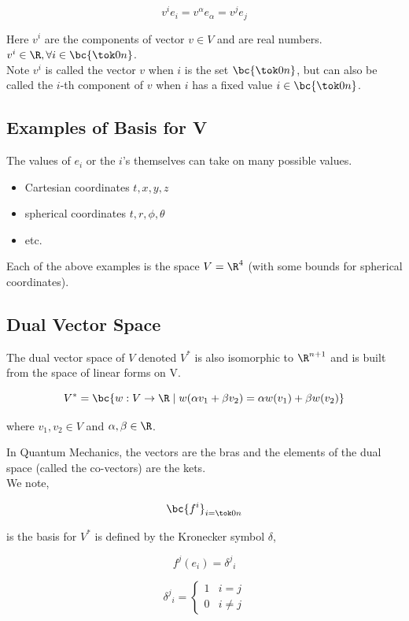 \documentclass{article}
\newcommand{\piecewise}[4]{
    \begin{cases}
        #1 & #2 \\
        #3 & #4
    \end{cases}
}
\begin{document}
\[ v^ie_i = v^{\alpha}e_{\alpha} = v^je_j \]

Here $v^i$ are the components of vector $v \in V$ and are real numbers. $v^i \in \R, \forall i \in \bc{\tok0n}$. \\

Note $v^i$ is called the vector $v$ when $i$ is the set $\bc{\tok0n}$, but can also be called the $i$-th component of $v$ when $i$ has a fixed value $i \in \bc{\tok0n}$. \\

\subsection{Examples of Basis for V}

The values of $e_i$ or the $i$'s themselves can take on many possible values.

\begin{itemize}
    \item Cartesian coordinates $t,x,y,z$
    \item spherical coordinates $t, r, \phi, \theta$
    \item etc.
\end{itemize}

Each of the above examples is the space $V = \R^4$ (with some bounds for spherical coordinates).

\subsection{Dual Vector Space}

The dual vector space of $V$ denoted $V^*$ is also isomorphic to $\R^{n+1}$ and is built from the space of linear forms on V.

\[ V^* = \bc{w: V \to \R \mid w(\alpha v_1 + \beta v_2) = \alpha w( v_1) + \beta w(v_2)} \]

where $v_1, v_2 \in V$ and $\alpha, \beta \in \R$.

In Quantum Mechanics, the vectors are the bras and the elements of the dual space (called the co-vectors) are the kets. \\

We note,

\[ \bc{f^i}_{i=\tok0n} \]

is the basis for $V^*$ is defined by the Kronecker symbol $\delta$,

\[ f^j(e_i) = {\delta^j}_i \]

\[ {\delta^j}_i = \piecewise{1}{i=j}{0}{i\neq j} \]
\end{document}
